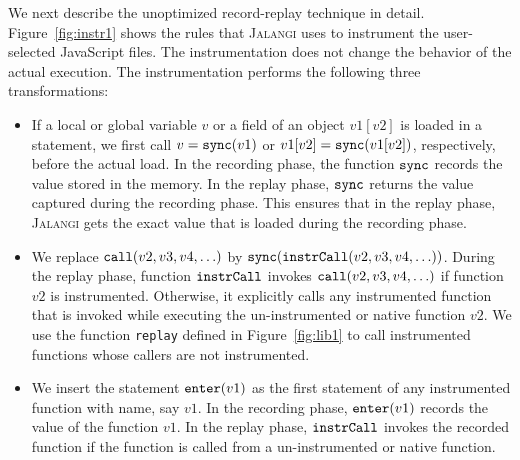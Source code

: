 \documentclass{sig-alternate}
\def\jalangi{\textsc{Jalangi}}
\newcommand \dsl [1] {\ensuremath{{\tt #1}}\xspace}
\newcommand \Sync{\dsl{sync}}
\newcommand \Enter{\dsl{enter}}
\begin{document}
We next describe the unoptimized record-replay technique in detail.
Figure~\ref{fig:instr1} shows the rules that \jalangi{} uses to
instrument the user-selected JavaScript files.  The instrumentation
does not change the behavior of the actual execution.  The
instrumentation performs the following three transformations:

\begin{itemize}
\item If a local or global variable $v$ or a field of an object
  $v1[v2]$ is loaded in a statement, we first call $v = \Sync(v1)$ or
  $v1[v2] = \Sync(v1[v2])$, respectively, before the actual load.  In
  the recording phase, the function $\Sync$ records the value stored
  in the memory.  In the replay phase, $\Sync$ returns the value
  captured during the recording phase.  This ensures that in the
  replay phase, \jalangi{} gets the exact value that is loaded during
  the recording phase.
\item We replace $\dsl{call}(v2, v3, v4, \ldots)$ by
  $\Sync(\dsl{instrCall}(v2, v3, v4, \ldots))$. During the replay
  phase, function $\dsl{instrCall}$ invokes $\dsl{call}(v2, v3, v4,
  \ldots)$ if function $v2$ is instrumented.  Otherwise, it explicitly
  calls any instrumented function that is invoked while executing the
  un-instrumented or native function $v2$.  We use the function
  \texttt{replay} defined in Figure~\ref{fig:lib1} to call
  instrumented functions whose callers are not instrumented.
\item We insert the statement $\Enter(v1)$ as the first statement of
  any instrumented function with name, say $v1$.  In the recording
  phase, $\Enter(v1)$ records the value of the function $v1$.  In the
  replay phase, $\dsl{instrCall}$ invokes the recorded function if the
  function is called from a un-instrumented or native function.
\end{itemize}
\end{document}
